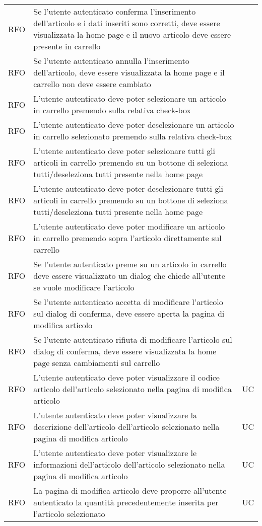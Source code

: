 \begin{table}
\begin{tabularx}{\textwidth}{lXl}
RFO & Se l'utente autenticato conferma l'inserimento dell'articolo e i dati inseriti sono corretti, deve essere visualizzata la home page e il nuovo articolo deve essere presente in carrello & \\
RFO & Se l'utente autenticato annulla l'inserimento dell'articolo, deve essere visualizzata la home page e il carrello non deve essere cambiato & \\
RFO & L'utente autenticato deve poter selezionare un articolo in carrello premendo sulla relativa check-box & \\
RFO & L'utente autenticato deve poter deselezionare un articolo in carrello selezionato premendo sulla relativa check-box & \\
RFO & L'utente autenticato deve poter selezionare tutti gli articoli in carrello premendo su un bottone di seleziona tutti/deseleziona tutti presente nella home page & \\
RFO & L'utente autenticato deve poter deselezionare tutti gli articoli in carrello premendo su un bottone di seleziona tutti/deseleziona tutti presente nella home page & \\
RFO & L'utente autenticato deve poter modificare un articolo in carrello premendo sopra l'articolo direttamente sul carrello & \\
RFO & Se l'utente autenticato preme su un articolo in carrello deve essere visualizzato un dialog che chiede all'utente se vuole modificare l'articolo & \\
RFO & Se l'utente autenticato accetta di modificare l'articolo sul dialog di conferma, deve essere aperta la pagina di modifica articolo & \\
RFO & Se l'utente autenticato rifiuta di modificare l'articolo sul dialog di conferma, deve essere visualizzata la home page senza cambiamenti sul carrello & \\
RFO & L'utente autenticato deve poter visualizzare il codice articolo dell'articolo selezionato nella pagina di modifica articolo & UC \\
RFO & L'utente autenticato deve poter visualizzare la descrizione dell'articolo dell'articolo selezionato nella pagina di modifica articolo & UC \\
RFO & L'utente autenticato deve poter visualizzare le informazioni dell'articolo dell'articolo selezionato nella pagina di modifica articolo & UC \\
RFO & La pagina di modifica articolo deve proporre all'utente autenticato la quantità precedentemente inserita per l'articolo selezionato & UC \\

\end{tabularx}
\end{table}
